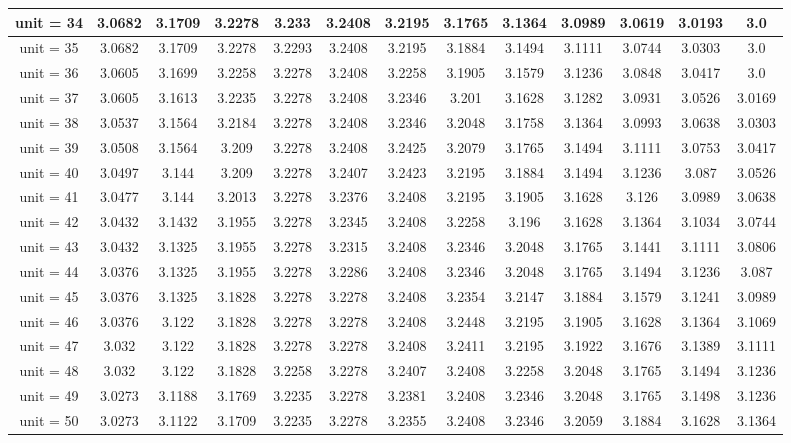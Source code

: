 \begin{table*}[ht]
\begin{tabular}{|c|c|c|c|c|c|c|c|c|c|c|c|c|}
\hline
unit = 34 &
3.0682 & 3.1709 & 3.2278 & 3.233 & 3.2408 & 3.2195 & 3.1765 & 3.1364 & 3.0989 & 3.0619 & 3.0193 & 3.0 \\
\hline
unit = 35 &
3.0682 & 3.1709 & 3.2278 & 3.2293 & 3.2408 & 3.2195 & 3.1884 & 3.1494 & 3.1111 & 3.0744 & 3.0303 & 3.0 \\
\hline
unit = 36 &
3.0605 & 3.1699 & 3.2258 & 3.2278 & 3.2408 & 3.2258 & 3.1905 & 3.1579 & 3.1236 & 3.0848 & 3.0417 & 3.0 \\
\hline
unit = 37 &
3.0605 & 3.1613 & 3.2235 & 3.2278 & 3.2408 & 3.2346 & 3.201 & 3.1628 & 3.1282 & 3.0931 & 3.0526 & 3.0169 \\
\hline
unit = 38 &
3.0537 & 3.1564 & 3.2184 & 3.2278 & 3.2408 & 3.2346 & 3.2048 & 3.1758 & 3.1364 & 3.0993 & 3.0638 & 3.0303 \\
\hline
unit = 39 &
3.0508 & 3.1564 & 3.209 & 3.2278 & 3.2408 & 3.2425 & 3.2079 & 3.1765 & 3.1494 & 3.1111 & 3.0753 & 3.0417 \\
\hline
unit = 40 &
3.0497 & 3.144 & 3.209 & 3.2278 & 3.2407 & 3.2423 & 3.2195 & 3.1884 & 3.1494 & 3.1236 & 3.087 & 3.0526 \\
\hline
unit = 41 &
3.0477 & 3.144 & 3.2013 & 3.2278 & 3.2376 & 3.2408 & 3.2195 & 3.1905 & 3.1628 & 3.126 & 3.0989 & 3.0638 \\
\hline
unit = 42 &
3.0432 & 3.1432 & 3.1955 & 3.2278 & 3.2345 & 3.2408 & 3.2258 & 3.196 & 3.1628 & 3.1364 & 3.1034 & 3.0744 \\
\hline
unit = 43 &
3.0432 & 3.1325 & 3.1955 & 3.2278 & 3.2315 & 3.2408 & 3.2346 & 3.2048 & 3.1765 & 3.1441 & 3.1111 & 3.0806 \\
\hline
unit = 44 &
3.0376 & 3.1325 & 3.1955 & 3.2278 & 3.2286 & 3.2408 & 3.2346 & 3.2048 & 3.1765 & 3.1494 & 3.1236 & 3.087 \\
\hline
unit = 45 &
3.0376 & 3.1325 & 3.1828 & 3.2278 & 3.2278 & 3.2408 & 3.2354 & 3.2147 & 3.1884 & 3.1579 & 3.1241 & 3.0989 \\
\hline
unit = 46 &
3.0376 & 3.122 & 3.1828 & 3.2278 & 3.2278 & 3.2408 & 3.2448 & 3.2195 & 3.1905 & 3.1628 & 3.1364 & 3.1069 \\
\hline
unit = 47 &
3.032 & 3.122 & 3.1828 & 3.2278 & 3.2278 & 3.2408 & 3.2411 & 3.2195 & 3.1922 & 3.1676 & 3.1389 & 3.1111 \\
\hline
unit = 48 &
3.032 & 3.122 & 3.1828 & 3.2258 & 3.2278 & 3.2407 & 3.2408 & 3.2258 & 3.2048 & 3.1765 & 3.1494 & 3.1236 \\
\hline
unit = 49 &
3.0273 & 3.1188 & 3.1769 & 3.2235 & 3.2278 & 3.2381 & 3.2408 & 3.2346 & 3.2048 & 3.1765 & 3.1498 & 3.1236 \\
\hline
unit = 50 &
3.0273 & 3.1122 & 3.1709 & 3.2235 & 3.2278 & 3.2355 & 3.2408 & 3.2346 & 3.2059 & 3.1884 & 3.1628 & 3.1364 \\
\hline
\end{tabular}
\normalsize
\end{table*}
